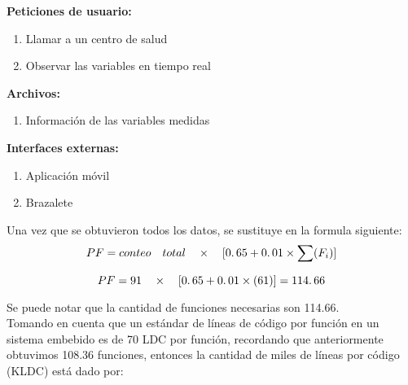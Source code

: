 \textbf{Peticiones de usuario:} \\

\begin{enumerate}
	\item Llamar a un centro de salud
	\item Observar las variables en tiempo real
\end{enumerate}

\textbf{Archivos:} \\

\begin{enumerate}
	\item Información de las variables medidas
\end{enumerate}

\textbf{Interfaces externas:} \\

\begin{enumerate}
	\item Aplicación móvil
	\item Brazalete
\end{enumerate}

Una vez que se obtuvieron todos los datos, se sustituye en la formula siguiente: \\

\begin{equation}
PF = conteo \quad total \quad \times \quad[0\ldotp65 + 0\ldotp01 \times \sum(F_i)]
\end{equation}

\begin{equation}
PF = 91 \quad \times \quad[0\ldotp65 + 0\ldotp01 \times (61)] = 114\ldotp66
\end{equation}

Se puede notar que la cantidad de funciones necesarias son 114.66. \\

Tomando en cuenta que un estándar de líneas de código por función en un sistema embebido es de 70 LDC por función, recordando que anteriormente obtuvimos 108.36 funciones, entonces la cantidad de miles de líneas por código (KLDC) está dado por: \\

